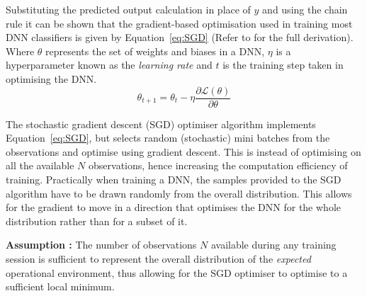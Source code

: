 Substituting the predicted output calculation in place of $\hat{y}$ and using the chain rule it can be shown that the gradient-based optimisation used in training most DNN classifiers is given by Equation~\ref{eq:SGD} (Refer to \cite{Parr2018} for the full derivation). 
%
Where $\theta$ represents the set of weights and biases in a DNN, $\eta$ is a hyperparameter known as the \textit{learning rate} and $t$ is the training step taken in optimising the DNN.  
\begin{equation} 
    \theta_{t+1} = \theta_{t} - \eta\dfrac{\partial \mathcal{L}(\theta)}{\partial \theta}
\label{eq:SGD}
\end{equation}

The stochastic gradient descent (SGD) optimiser algorithm implements Equation~\ref{eq:SGD}, but selects random (stochastic) mini batches from the observations and optimise using gradient descent. This is instead of optimising on all the available $N$ observations, hence increasing the computation efficiency of training.
%
Practically when training a DNN, the samples provided to the SGD algorithm have to be drawn randomly from the overall distribution. This allows for the gradient to move in a direction that optimises the DNN for the whole distribution rather than for a subset of it. 

\noindent\textbf{Assumption \assumptionSGDfirst:} The number of observations $N$ available during any training session is sufficient to represent the overall distribution of the \textit{expected} operational environment, thus allowing for the SGD optimiser to optimise to a sufficient local minimum.

%

%



